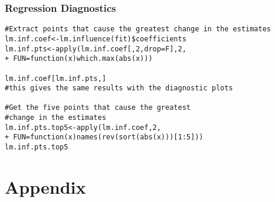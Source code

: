 \documentclass[compress]{beamer}
\begin{document}
\begin{frame}[fragile]\frametitle{Regression Diagnostics}
\small\begin{verbatim}
#Extract points that cause the greatest change in the estimates
lm.inf.coef<-lm.influence(fit)$coefficients
lm.inf.pts<-apply(lm.inf.coef[,2,drop=F],2,
+ FUN=function(x)which.max(abs(x)))

lm.inf.coef[lm.inf.pts,] 
#this gives the same results with the diagnostic plots

#Get the five points that cause the greatest 
#change in the estimates
lm.inf.pts.top5<-apply(lm.inf.coef,2, 
+ FUN=function(x)names(rev(sort(abs(x)))[1:5]))
lm.inf.pts.top5
\end{verbatim}
\end{frame}

\section{Appendix}
\end{document}
